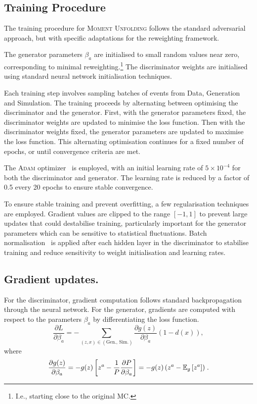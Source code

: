     \subsection{Training Procedure}
        The training procedure for \textsc{Moment Unfolding} follows the standard adversarial approach, but with specific adaptations for the reweighting framework.
        
        The generator parameters $\beta_a$ are initialised to small random values near zero, corresponding to minimal reweighting.\footnote{I.e., starting close to the original MC.}
        The discriminator weights are initialised using standard neural network initialisation techniques\cite{7410480}.
        
        Each training step involves sampling batches of events from Data, Generation and Simulation.
        The training proceeds by alternating between optimising the discriminator and the generator.
        First, with the generator parameters fixed, the discriminator weights are updated to minimise the loss function.
        Then with the discriminator weights fixed, the generator parameters are updated to maximise the loss function.
        This alternating optimisation continues for a fixed number of epochs, or until convergence criteria are met.

        The \textsc{Adam} optimizer~\cite{kingma_adam_2017} is employed, with an initial learning rate of $5 \times 10^{-4}$ for both the discriminator and generator.
        The learning rate is reduced by a factor of 0.5 every 20 epochs to ensure stable convergence.

        To ensure stable training and prevent overfitting, a few regularisation techniques are employed.
        Gradient values are clipped to the range $[-1, 1]$ to prevent large updates that could destabilise training, particularly important for the generator parameters which can be sensitive to statistical fluctuations.
        Batch normalisation~\cite{Ioffe2015BatchShift} is applied after each hidden layer in the discriminator to stabilise training and reduce sensitivity to weight initialisation and learning rates.
        
    \subsection{Gradient updates.}
    
        For the discriminator, gradient computation follows standard backpropagation through the neural network.
        For the generator, gradients are computed with respect to the parameters $\beta_a$ by differentiating the loss function.
        \[ 
            \frac{\partial L}{\partial \beta_a} = -\sum_{(z,x) \in (\text{Gen., Sim.})} \frac{\partial g(z)}{\partial \beta_a}(1-d(x)),
        \]
        where
        \[
            \frac{\partial g(z)}{\partial \beta_a} = -g(z)\left[z^a - \frac{1}{P}\frac{\partial P}{\partial \beta_a}\right] = -g(z)\,\qty(z^a - \operatorname{\mathbb{E}}_g\qty[z^a])\;.
        \]
        
